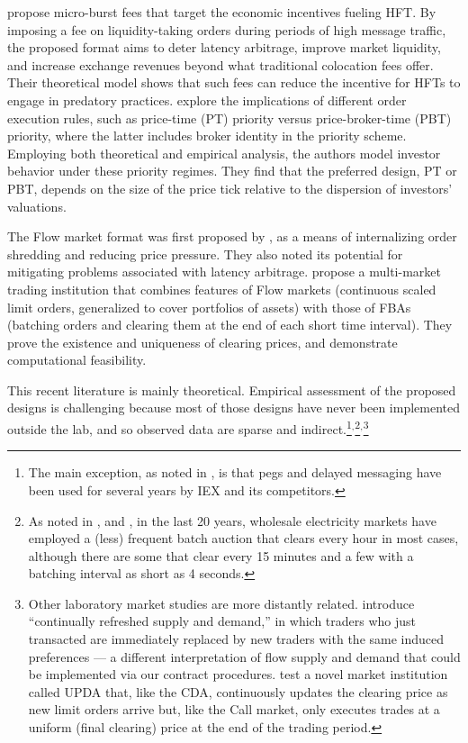 \documentclass[12pt]{article}
\begin{document}
\cite{brolley2023} propose micro-burst fees that target the economic incentives fueling HFT. By imposing a fee on liquidity-taking orders during periods of high message traffic, the proposed format aims to deter latency arbitrage, improve market liquidity, and increase exchange revenues beyond what traditional colocation fees offer. Their theoretical model shows that such fees can reduce the incentive for HFTs to engage in predatory practices. 
\cite{Degryse2022} explore the implications of different order execution rules, such as price-time (PT) priority versus price-broker-time (PBT) priority, where the latter includes broker identity in the priority scheme. Employing both theoretical and empirical analysis, the authors model investor behavior under these priority regimes. They find that the preferred design, PT or PBT, depends on the size of the price tick relative to the dispersion of investors' valuations. 

The Flow market format was first proposed by  \cite{Kyle2017}, as a means of internalizing order shredding and reducing price pressure. They also noted its potential for mitigating problems associated with latency arbitrage.
\cite{Budish2023} propose a multi-market trading institution that combines features of Flow markets (continuous scaled limit orders, generalized to cover portfolios of assets) with those of FBAs (batching orders and clearing them at the end of each short time interval). 
They prove the existence and uniqueness of clearing prices, and demonstrate computational feasibility.

This recent literature is mainly theoretical. 
Empirical assessment of the proposed designs is challenging because most of those designs have never been implemented outside the lab, and so observed data are sparse and indirect.\footnote{
The main exception, as noted in \cite{Aldrich2022}, is that pegs and delayed messaging have been used for several years by IEX and its competitors.}$^,$\footnote{As noted in \cite{cramton2017electricity}, and \cite{cramton2024forward}, 
in the last 20 years, wholesale electricity markets have employed a (less) frequent batch auction that clears every hour in most cases, although there are some that clear every 15 minutes and a few with a batching interval as short as 4 
seconds.}$^,$\footnote{Other laboratory market studies are more distantly related. \citep{brewer2002behavioral} 
introduce ``continually refreshed supply and demand,'' in which traders who just transacted are immediately replaced by new traders with the same induced preferences --- a different interpretation of flow supply and demand that could be implemented via our contract procedures. 
\cite{mccabe1993designing} test a novel market institution called UPDA that, like the CDA, continuously updates the clearing price as new limit orders arrive but, like the Call market, only executes trades at a uniform (final clearing) price at the end of the trading period.}
\end{document}
